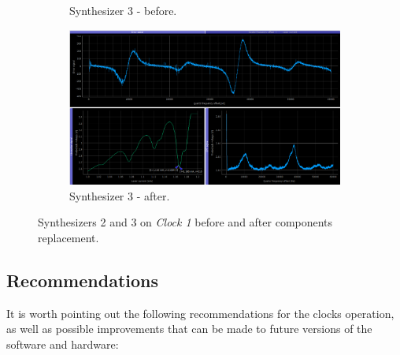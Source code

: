 \documentclass[a4paper,12pt]{article}
\begin{document}
\begin{figure}[!h]
\begin{subfigure}[b]{0.49\textwidth}
\captionsetup{justification=centering}
\caption{Synthesizer 3 - before.}
\end{subfigure}
\hfill
\begin{subfigure}[b]{0.49\textwidth}
\centering
\includegraphics[width=\textwidth]{Images/synth_3_after.png}
\captionsetup{justification=centering}
\caption{Synthesizer 3 - after.}
\end{subfigure}
\caption{Synthesizers 2 and 3 on \textit{Clock 1} before and after components replacement.} 
\label{fig:synth_final}
\end{figure}

\subsection{Recommendations}
It is worth pointing out the following recommendations for the clocks operation, as well as possible improvements that can be made to future versions of the software and hardware:
\end{document}
